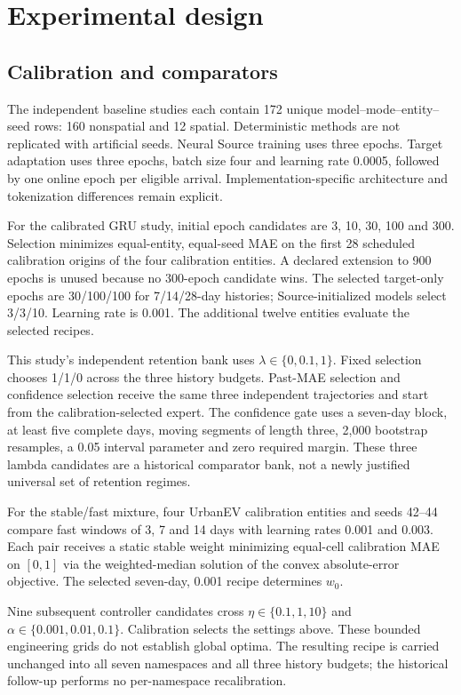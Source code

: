\documentclass[pdflatex,iicol,sn-mathphys-num]{sn-jnl}
\begin{document}
\section{Experimental design}
\subsection{Calibration and comparators}
The independent baseline studies each contain 172 unique model--mode--entity--seed rows: 160 nonspatial and 12 spatial. Deterministic methods are not replicated with artificial seeds. Neural Source training uses three epochs. Target adaptation uses three epochs, batch size four and learning rate 0.0005, followed by one online epoch per eligible arrival. Implementation-specific architecture and tokenization differences remain explicit.

For the calibrated GRU study, initial epoch candidates are 3, 10, 30, 100 and 300. Selection minimizes equal-entity, equal-seed MAE on the first 28 scheduled calibration origins of the four calibration entities. A declared extension to 900 epochs is unused because no 300-epoch candidate wins. The selected target-only epochs are 30/100/100 for 7/14/28-day histories; Source-initialized models select 3/3/10. Learning rate is 0.001. The additional twelve entities evaluate the selected recipes.

This study's independent retention bank uses $\lambda\in\{0,0.1,1\}$. Fixed selection chooses 1/1/0 across the three history budgets. Past-MAE selection and confidence selection receive the same three independent trajectories and start from the calibration-selected expert. The confidence gate uses a seven-day block, at least five complete days, moving segments of length three, 2,000 bootstrap resamples, a 0.05 interval parameter and zero required margin. These three lambda candidates are a historical comparator bank, not a newly justified universal set of retention regimes.

For the stable/fast mixture, four UrbanEV calibration entities and seeds 42--44 compare fast windows of 3, 7 and 14 days with learning rates 0.001 and 0.003. Each pair receives a static stable weight minimizing equal-cell calibration MAE on $[0,1]$ via the weighted-median solution of the convex absolute-error objective. The selected seven-day, 0.001 recipe determines $w_0$.

Nine subsequent controller candidates cross $\eta\in\{0.1,1,10\}$ and $\alpha\in\{0.001,0.01,0.1\}$. Calibration selects the settings above. These bounded engineering grids do not establish global optima. The resulting recipe is carried unchanged into all seven namespaces and all three history budgets; the historical follow-up performs no per-namespace recalibration.
\end{document}
